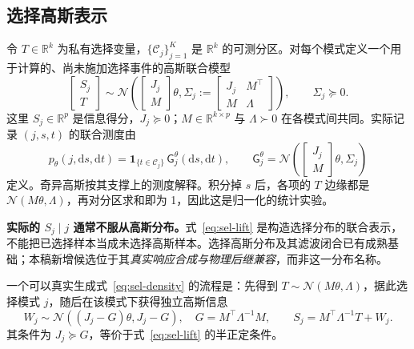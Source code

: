 \documentclass[UTF8,fontset=fandol,11pt,a4paper]{ctexart}
\newcommand{\R}{\mathbb R}
\newcommand{\N}{\mathcal N}
\newcommand{\dd}{\mathrm d}
\theoremstyle{definition}
\theoremstyle{remark}
\numberwithin{equation}{section}
\begin{document}
\subsection{选择高斯表示}
令 $T\in\R^k$ 为私有选择变量，$\{\mathcal C_j\}_{j=1}^K$ 是 $\R^k$ 的可测分区。对每个模式定义一个用于计算的、尚未施加选择事件的高斯联合模型
\begin{equation}
 \begin{bmatrix}S_j\\T\end{bmatrix}
 \sim\N\!\left(
 \begin{bmatrix}J_j\\M\end{bmatrix}\theta,
 \Sigma_j:=\begin{bmatrix}J_j&M^\top\\M&\Lambda\end{bmatrix}
 \right),\qquad \Sigma_j\succeq0.
 \label{eq:sel-lift}
\end{equation}
这里 $S_j\in\R^p$ 是信息得分，$J_j\succeq0$；$M\in\R^{k\times p}$ 与 $\Lambda\succ0$ 在各模式间共同。实际记录 $(j,s,t)$ 的联合测度由
\begin{equation}
 p_\theta(j,\dd s,\dd t)
 =\mathbf1_{\{t\in\mathcal C_j\}}\,\mathsf G_j^\theta(\dd s,\dd t),\qquad
 \mathsf G_j^\theta=\N\!\left(\begin{bmatrix}J_j\\M\end{bmatrix}\theta,\Sigma_j\right)
 \label{eq:sel-density}
\end{equation}
定义。奇异高斯按其支撑上的测度解释。积分掉 $s$ 后，各项的 $T$ 边缘都是 $\N(M\theta,\Lambda)$，再对分区求和即为 1，因此这是归一化的统计实验。

\textbf{实际的 $S_j\mid j$ 通常不服从高斯分布。}式~\eqref{eq:sel-lift} 是构造选择分布的联合表示，不能把已选择样本当成未选择高斯样本。选择高斯分布及其滤波闭合已有成熟基础\cite{naveau,selectionkalman,omre}；本稿新增候选位于其\emph{真实响应合成与物理后继兼容}，而非这一分布名称。

一个可以真实生成式~\eqref{eq:sel-density} 的流程是：先得到 $T\sim\N(M\theta,\Lambda)$，据此选择模式 $j$，随后在该模式下获得独立高斯信息
\begin{equation}
 W_j\sim\N((J_j-G)\theta,J_j-G),\quad
 G=M^\top\Lambda^{-1}M,\qquad
 S_j=M^\top\Lambda^{-1}T+W_j.
 \label{eq:sel-init}
\end{equation}
其条件为 $J_j\succeq G$，等价于式~\eqref{eq:sel-lift} 的半正定条件。
\end{document}
